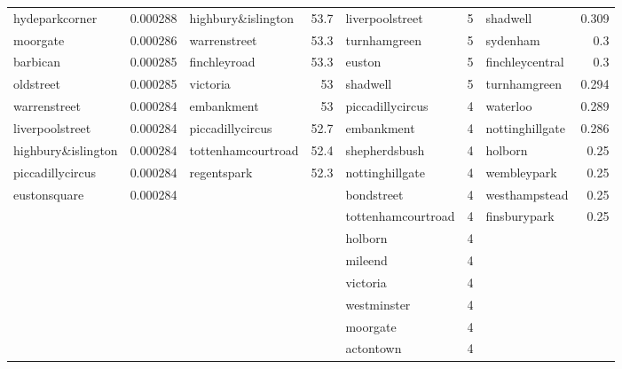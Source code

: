 \begin{adjustwidth}{-1.3in}{-1.3in}
\begin{center}
\begin{tabular}{lrlrlrlr}
 hydeparkcorner      &    0.000288 & highbury\&islington  &    53.7 & liverpoolstreet     &      5 & shadwell            &  0.309 \\
 moorgate            &    0.000286 & warrenstreet        &    53.3 & turnhamgreen        &      5 & sydenham            &  0.3   \\
 barbican            &    0.000285 & finchleyroad        &    53.3 & euston              &      5 & finchleycentral     &  0.3   \\
 oldstreet           &    0.000285 & victoria            &    53   & shadwell            &      5 & turnhamgreen        &  0.294 \\
 warrenstreet        &    0.000284 & embankment          &    53   & piccadillycircus    &      4 & waterloo            &  0.289 \\
 liverpoolstreet     &    0.000284 & piccadillycircus    &    52.7 & embankment          &      4 & nottinghillgate     &  0.286 \\
 highbury\&islington  &    0.000284 & tottenhamcourtroad  &    52.4 & shepherdsbush       &      4 & holborn             &  0.25  \\
 piccadillycircus    &    0.000284 & regentspark         &    52.3 & nottinghillgate     &      4 & wembleypark         &  0.25  \\
 eustonsquare        &    0.000284 &                     &         & bondstreet          &      4 & westhampstead       &  0.25  \\
                     &             &                     &         & tottenhamcourtroad  &      4 & finsburypark        &  0.25  \\
                     &             &                     &         & holborn             &      4 &                     &        \\
                     &             &                     &         & mileend             &      4 &                     &        \\
                     &             &                     &         & victoria            &      4 &                     &        \\
                     &             &                     &         & westminster         &      4 &                     &        \\
                     &             &                     &         & moorgate            &      4 &                     &        \\
                     &             &                     &         & actontown           &      4 &                     &        \\

\end{tabular}
\end{center}
\end{adjustwidth}
